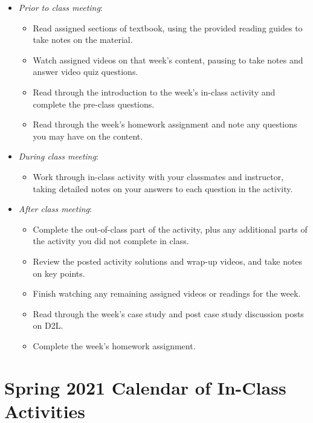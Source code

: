 \documentclass[
]{report}
\providecommand{\tightlist}{%
  \setlength{\itemsep}{0pt}\setlength{\parskip}{0pt}}
\begin{document}
\begin{itemize}
\tightlist
\item
  \emph{Prior to class meeting}:

  \begin{itemize}
  \tightlist
  \item
    Read assigned sections of textbook, using the provided reading guides to take notes on the material.
  \item
    Watch assigned videos on that week's content, pausing to take notes and answer video quiz questions.
  \item
    Read through the introduction to the week's in-class activity and complete the pre-class questions.
  \item
    Read through the week's homework assignment and note any questions you may have on the content.
  \end{itemize}
\item
  \emph{During class meeting}:

  \begin{itemize}
  \tightlist
  \item
    Work through in-class activity with your classmates and instructor, taking detailed notes on your answers to each question in the activity.
  \end{itemize}
\item
  \emph{After class meeting}:

  \begin{itemize}
  \tightlist
  \item
    Complete the out-of-class part of the activity, plus any additional parts of the activity you did not complete in class.
  \item
    Review the posted activity solutions and wrap-up videos, and take notes on key points.
  \item
    Finish watching any remaining assigned videos or readings for the week.
  \item
    Read through the week's case study and post case study discussion posts on D2L.
  \item
    Complete the week's homework assignment.
  \end{itemize}
\end{itemize}

\hypertarget{spring-2021-calendar-of-in-class-activities}{%
\chapter*{Spring 2021 Calendar of In-Class Activities}\label{spring-2021-calendar-of-in-class-activities}}
\end{document}
